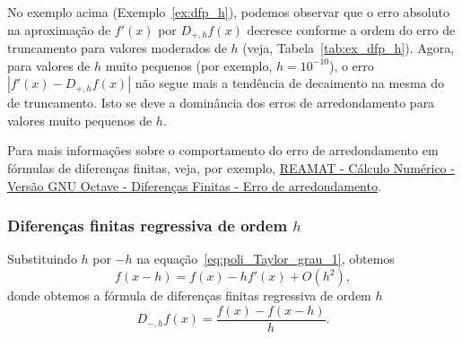 \begin{obs}
  No exemplo acima (Exemplo~\ref{ex:dfp_h}), podemos observar que o erro absoluto na aproximação de $f'(x)$ por $D_{+,h}f(x)$ decresce conforme a ordem do erro de truncamento para valores moderados de $h$ (veja, Tabela~\ref{tab:ex_dfp_h}). Agora, para valores de $h$ muito pequenos (por exemplo, $h=10^{-10}$), o erro $|f'(x)-D_{+,h}f(x)|$ não segue mais a tendência de decaimento na mesma do de truncamento. Isto se deve a dominância dos erros de arredondamento para valores muito pequenos de $h$. 

  Para mais informações sobre o comportamento do erro de arredondamento em fórmulas de diferenças finitas, veja, por exemplo, \href{https://www.ufrgs.br/reamat/CalculoNumerico/livro-oct/dn-diferencas_finitas.html}{REAMAT - Cálculo Numérico - Versão GNU Octave - Diferenças Finitas - Erro de arredondamento}.
\end{obs}

\subsubsection{Diferenças finitas regressiva de ordem $h$}

Substituindo $h$ por $-h$ na equação~\eqref{eq:poli_Taylor_grau_1}, obtemos
\begin{equation}
  f(x-h) = f(x) - hf'(x) + O(h^2),
\end{equation}
donde obtemos a fórmula de diferenças finitas regressiva de ordem $h$
\begin{equation}\label{eq:dfr_h}
  D_{-,h}f(x) = \frac{f(x) - f(x-h)}{h}.
\end{equation}

